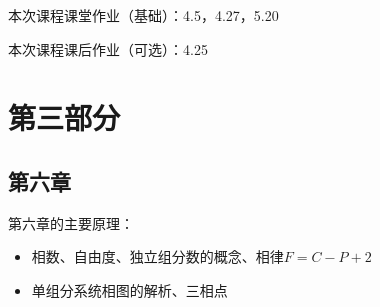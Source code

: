 \documentclass[9pt]{beamer}
\begin{document}
	\begin{frame}
	
	本次课程课堂作业（基础）：4.5，4.27，5.20
	
	\hspace*{\fill}	
	
	本次课程课后作业（可选）：4.25
	
	\end{frame}

	\section{第三部分}	
	
	\subsection{第六章}
	\begin{frame}
	
	第六章的主要原理：
	\begin{itemize}
	
	\item 相数、自由度、独立组分数的概念、相律$F=C-P+2$
	
	\item 单组分系统相图的解析、三相点
	
	\end{itemize}
	
	\vspace*{-1em}
	

\end{frame}
\end{document}
